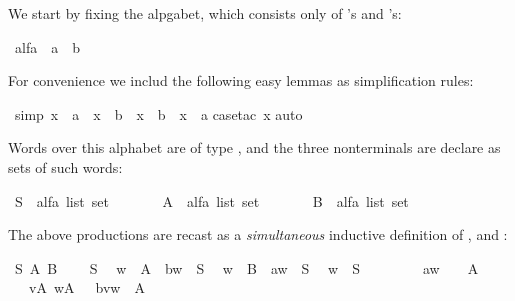 \begin{isabellebody}
\begin{isamarkuptext}
We start by fixing the alpgabet, which consists only of 's
and 's:%
\end{isamarkuptext}%
\ alfa\ {\isacharequal}\ a\ {\isacharbar}\ b%
\begin{isamarkuptext}%
\noindent
For convenience we includ the following easy lemmas as simplification rules:%
\end{isamarkuptext}%
\ {\isacharbrackleft}simp{\isacharbrackright}{\isacharcolon}\ {\isachardoublequote}{\isacharparenleft}x\ {\isasymnoteq}\ a{\isacharparenright}\ {\isacharequal}\ {\isacharparenleft}x\ {\isacharequal}\ b{\isacharparenright}\ {\isasymand}\ {\isacharparenleft}x\ {\isasymnoteq}\ b{\isacharparenright}\ {\isacharequal}\ {\isacharparenleft}x\ {\isacharequal}\ a{\isacharparenright}{\isachardoublequote}\isanewline
{}case{\isacharunderscore}tac\ x{\isacharparenright}\isanewline
{}auto{\isacharparenright}%
\begin{isamarkuptext}%
\noindent
Words over this alphabet are of type , and
the three nonterminals are declare as sets of such words:%
\end{isamarkuptext}%
\ S\ {\isacharcolon}{\isacharcolon}\ {\isachardoublequote}alfa\ list\ set{\isachardoublequote}\isanewline
\ \ \ \ \ \ \ A\ {\isacharcolon}{\isacharcolon}\ {\isachardoublequote}alfa\ list\ set{\isachardoublequote}\isanewline
\ \ \ \ \ \ \ B\ {\isacharcolon}{\isacharcolon}\ {\isachardoublequote}alfa\ list\ set{\isachardoublequote}%
\begin{isamarkuptext}%
\noindent
The above productions are recast as a \emph{simultaneous} inductive
definition
of ,  and :%
\end{isamarkuptext}%
\ S\ A\ B\isanewline
{}\isanewline
\ \ {\isachardoublequote}{\isacharbrackleft}{\isacharbrackright}\ {\isasymin}\ S{\isachardoublequote}\isanewline
\ \ {\isachardoublequote}w\ {\isasymin}\ A\ {\isasymLongrightarrow}\ b{\isacharhash}w\ {\isasymin}\ S{\isachardoublequote}\isanewline
\ \ {\isachardoublequote}w\ {\isasymin}\ B\ {\isasymLongrightarrow}\ a{\isacharhash}w\ {\isasymin}\ S{\isachardoublequote}\isanewline
\isanewline
\ \ {\isachardoublequote}w\ {\isasymin}\ S\ \ \ \ \ \ \ \ {\isasymLongrightarrow}\ a{\isacharhash}w\ \ \ {\isasymin}\ A{\isachardoublequote}\isanewline
\ \ {\isachardoublequote}{\isasymlbrakk}\ v{\isasymin}A{\isacharsemicolon}\ w{\isasymin}A\ {\isasymrbrakk}\ {\isasymLongrightarrow}\ b{\isacharhash}v{\isacharat}w\ {\isasymin}\ A{\isachardoublequote}\isanewline

\end{isabellebody}
